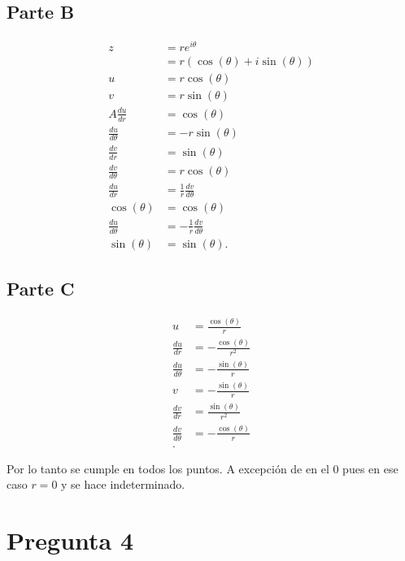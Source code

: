 \documentclass[12pt]{exam}
\begin{document}
\subsection*{Parte B}

\begin{align*}
  z &= re^{i\theta}\\
  &= r\left( \cos\left( \theta \right) + i \sin\left( \theta \right)  \right)  \\
  u &= r\cos\left( \theta \right)  \\
  v &= r\sin\left( \theta \right)  \\A
  \frac{du}{dr} &= \cos\left( \theta \right)  \\
  \frac{du}{d\theta} &= -r\sin\left( \theta \right)  \\
  \frac{dv}{dr} &= \sin\left( \theta \right)  \\
  \frac{dv}{d\theta} &= r\cos\left( \theta \right)  \\
  \frac{du}{dr} &= \frac{1}{r}\frac{dv}{d\theta} \\
  \cos\left( \theta \right)  &= \cos\left( \theta \right)  \\
  \frac{du}{d\theta} &= -\frac{1}{r}\frac{dv}{d\theta} \\
  \sin\left( \theta \right)  &= \sin\left( \theta \right) 
.\end{align*}

\subsection*{Parte C}

\begin{align*}
  u &= \frac{\cos\left( \theta \right) }{r}\\
  \frac{du}{dr} &= -\frac{\cos\left( \theta \right) }{r^2}\\
  \frac{du}{d\theta} &= -\frac{\sin\left( \theta \right) }{r} \\
  v &= -\frac{\sin\left( \theta \right) }{r} \\
  \frac{dv}{dr} &= \frac{\sin\left( \theta \right) }{r^2} \\
  \frac{dv}{d\theta} &= -\frac{\cos\left( \theta \right) }{r} \\
.\end{align*}

Por lo tanto se cumple en todos los puntos. A excepción de en el $0$ pues en ese caso $r=0$ y se hace indeterminado.

\section*{Pregunta 4}
\end{document}
